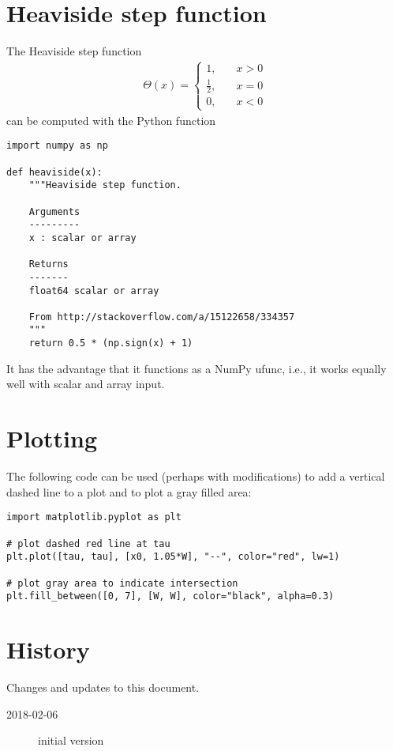 \documentclass[letterpaper]{scrartcl}
\begin{document}
\appendix{}

\section{Heaviside step function}
\label{sec:heaviside}

The Heaviside step function
\begin{gather}
  \label{eq:heaviside}
  \Theta(x) =
  \begin{cases}
    1,& \quad x > 0\\
    \frac{1}{2},& \quad x = 0\\
    0,& \quad x < 0
  \end{cases}
\end{gather}
can be computed with the Python function
\begin{verbatim}
import numpy as np

def heaviside(x):
    """Heaviside step function.
    
    Arguments
    ---------
    x : scalar or array
    
    Returns
    -------
    float64 scalar or array
    
    From http://stackoverflow.com/a/15122658/334357
    """
    return 0.5 * (np.sign(x) + 1)  
\end{verbatim}
It has the advantage that it functions as a NumPy ufunc, i.e., it
works equally well with scalar and array input.

\section{Plotting}
\label{sec:plot}

The following code can be used (perhaps with modifications) to add a
vertical dashed line to a plot and to plot a gray filled area:
\begin{verbatim}
import matplotlib.pyplot as plt

# plot dashed red line at tau
plt.plot([tau, tau], [x0, 1.05*W], "--", color="red", lw=1)

# plot gray area to indicate intersection
plt.fill_between([0, 7], [W, W], color="black", alpha=0.3)
\end{verbatim}

\section{History}
\label{sec:history}

Changes and updates to this document.
\begin{description}
\item[2018-02-06] initial version
\end{description}
\end{document}
